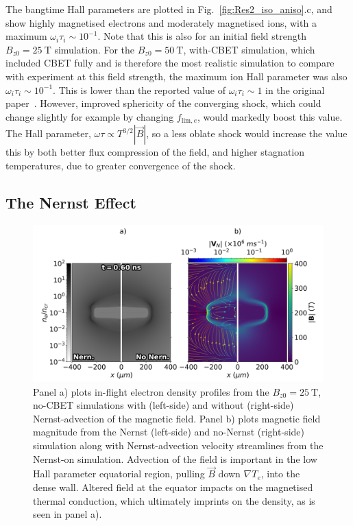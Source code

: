 The bangtime Hall parameters are plotted in Fig.~\ref{fig:Res2_iso_aniso}.c, and show highly magnetised electrons and moderately magnetised ions, with a maximum $\omega_i\tau_i\sim10^{-1}$.
Note that this is also for an initial field strength $B_{z0}=25\ \text{T}$ simulation.
For the $B_{z0}=50\ \text{T}$, with-\ac{CBET} simulation, which included \ac{CBET} fully and is therefore the most realistic simulation to compare with experiment at this field strength, the maximum ion Hall parameter was also $\omega_i\tau_i\sim10^{-1}$.
This is lower than the reported value of $\omega_i\tau_i\sim1$ in the original paper~\cite{bose_effect_2022}.
However, improved sphericity of the converging shock, which could change slightly for example by changing $f_{\text{lim},e}$, would markedly boost this value.
The Hall parameter, $\omega\tau\propto T^{3/2}|\vec{B}|$, so a less oblate shock would increase the value this by both better flux compression of the field, and higher stagnation temperatures, due to greater convergence of the shock.

\subsection{The Nernst Effect}%
\label{sec:Res2_nernst}

\begin{figure}[t!]
    \includegraphics[width=\linewidth]{Results2/Images/nernst_comp_Bstream.png}
    \centering
    \caption{Panel a) plots in-flight electron density profiles from the $B_{z0}=25\ \text{T}$, no-\ac{CBET} simulations with (left-side) and without (right-side) Nernst-advection of the magnetic field.
    Panel b) plots magnetic field magnitude from the Nernst (left-side) and no-Nernst (right-side) simulation along with Nernst-advection velocity streamlines from the Nernst-on simulation.
    Advection of the field is important in the low Hall parameter equatorial region, pulling $\vec{B}$ down $\nabla T_e$, into the dense wall.
    Altered field at the equator impacts on the magnetised thermal conduction, which ultimately imprints on the density, as is seen in panel a).}%
    \label{fig:Res2_nernst_comp}
\end{figure}

